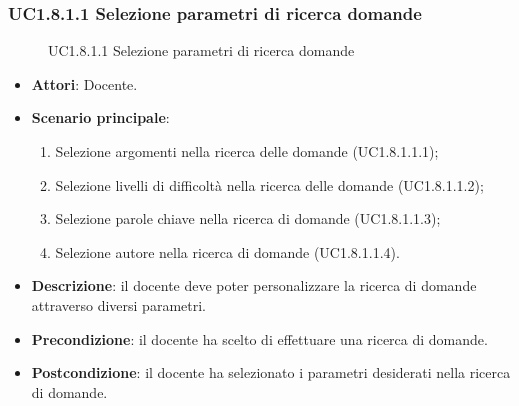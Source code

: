 \subsubsection{UC1.8.1.1 Selezione parametri di ricerca domande}
\begin{figure}[H]
\centering
\noindent{}
\caption{UC1.8.1.1 Selezione parametri di ricerca domande}
\end{figure}
\begin{itemize}
\item \textbf{Attori}: Docente.
\item \textbf{Scenario principale}:
\begin{enumerate}
\item Selezione argomenti nella ricerca delle domande (UC1.8.1.1.1);
\item Selezione livelli di difficoltà nella ricerca delle domande (UC1.8.1.1.2);
\item Selezione parole chiave nella ricerca di domande (UC1.8.1.1.3);
\item Selezione autore nella ricerca di domande (UC1.8.1.1.4).
\end{enumerate}
\item \textbf{Descrizione}: il docente deve poter personalizzare la ricerca di domande attraverso diversi parametri.
\item \textbf{Precondizione}: il docente ha scelto di effettuare una ricerca di domande.
\item \textbf{Postcondizione}: il docente ha selezionato i parametri desiderati nella ricerca di domande.
\end{itemize}
